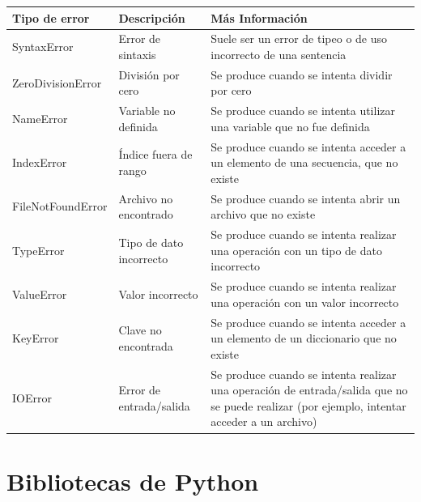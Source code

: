 \documentclass[
  letterpaper,
  DIV=11,
  numbers=noendperiod]{scrreprt}
\begin{document}
\begin{longtable}[]{@{}
  >{\raggedright\arraybackslash}p{}
  >{\raggedright\arraybackslash}p{}
  >{\raggedright\arraybackslash}p{}@{}}
\toprule\noalign{}
\begin{minipage}[b]{\linewidth}\raggedright
Tipo de error
\end{minipage} & \begin{minipage}[b]{\linewidth}\raggedright
Descripción
\end{minipage} & \begin{minipage}[b]{\linewidth}\raggedright
Más Información
\end{minipage} \\
\midrule\noalign{}
\endhead
\bottomrule\noalign{}
\endlastfoot
SyntaxError & Error de sintaxis & Suele ser un error de tipeo o de uso
incorrecto de una sentencia \\
ZeroDivisionError & División por cero & Se produce cuando se intenta
dividir por cero \\
NameError & Variable no definida & Se produce cuando se intenta utilizar
una variable que no fue definida \\
IndexError & Índice fuera de rango & Se produce cuando se intenta
acceder a un elemento de una secuencia, que no existe \\
FileNotFoundError & Archivo no encontrado & Se produce cuando se intenta
abrir un archivo que no existe \\
TypeError & Tipo de dato incorrecto & Se produce cuando se intenta
realizar una operación con un tipo de dato incorrecto \\
ValueError & Valor incorrecto & Se produce cuando se intenta realizar
una operación con un valor incorrecto \\
KeyError & Clave no encontrada & Se produce cuando se intenta acceder a
un elemento de un diccionario que no existe \\
IOError & Error de entrada/salida & Se produce cuando se intenta
realizar una operación de entrada/salida que no se puede realizar (por
ejemplo, intentar acceder a un archivo) \\
\end{longtable}


\chapter{Bibliotecas de Python}\label{bibliotecas-de-python}
\end{document}
